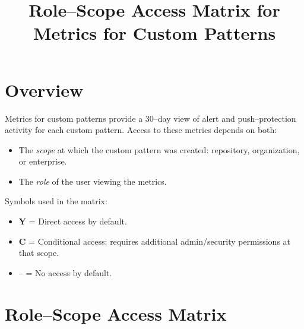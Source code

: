 \documentclass[11pt]{article}
\newcommand{\Yes}{\textbf{Y}}    %
\newcommand{\Cond}{\textbf{C}}   %
\newcommand{\No}{--}             %
\begin{document}
\title{Role--Scope Access Matrix for Metrics for Custom Patterns}
\author{}
\date{}
\maketitle

\section*{Overview}

Metrics for custom patterns provide a 30--day view of alert and push--protection
activity for each custom pattern.  Access to these metrics depends on both:

\begin{itemize}
  \item The \emph{scope} at which the custom pattern was created:
        repository, organization, or enterprise.
  \item The \emph{role} of the user viewing the metrics.
\end{itemize}

\noindent
Symbols used in the matrix:
\begin{itemize}
  \item \Yes{} = Direct access by default.
  \item \Cond{} = Conditional access; requires additional admin/security
        permissions at that scope.
  \item \No{} = No access by default.
\end{itemize}

\section*{Role--Scope Access Matrix}
\end{document}
